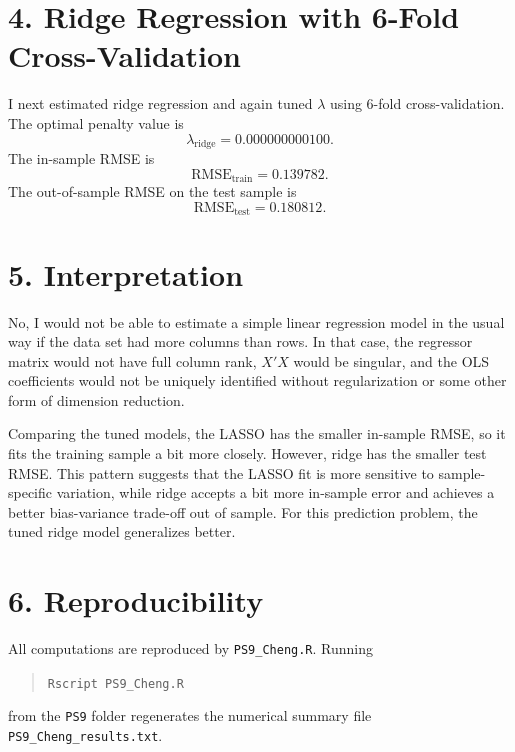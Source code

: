 \documentclass[11pt]{article}
\begin{document}
\section*{4. Ridge Regression with 6-Fold Cross-Validation}
I next estimated ridge regression and again tuned \(\lambda\) using 6-fold cross-validation.
The optimal penalty value is
\[
\lambda_{\text{ridge}} = 0.000000000100.
\]
The in-sample RMSE is
\[
\text{RMSE}_{\text{train}} = 0.139782.
\]
The out-of-sample RMSE on the test sample is
\[
\text{RMSE}_{\text{test}} = 0.180812.
\]

\section*{5. Interpretation}
No, I would not be able to estimate a simple linear regression model in the usual way if the data set had more columns than rows.
In that case, the regressor matrix would not have full column rank, \(X'X\) would be singular, and the OLS coefficients would not be uniquely identified without regularization or some other form of dimension reduction.

Comparing the tuned models, the LASSO has the smaller in-sample RMSE, so it fits the training sample a bit more closely.
However, ridge has the smaller test RMSE.
This pattern suggests that the LASSO fit is more sensitive to sample-specific variation, while ridge accepts a bit more in-sample error and achieves a better bias-variance trade-off out of sample.
For this prediction problem, the tuned ridge model generalizes better.

\section*{6. Reproducibility}
All computations are reproduced by \texttt{PS9\_Cheng.R}.
Running
\begin{quote}
\texttt{Rscript PS9\_Cheng.R}
\end{quote}
from the \texttt{PS9} folder regenerates the numerical summary file \texttt{PS9\_Cheng\_results.txt}.
\end{document}
